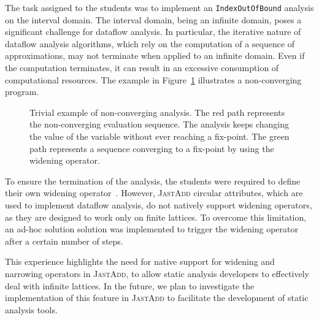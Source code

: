 The task assigned to the students was to implement an \texttt{IndexOutOfBound} analysis on the interval domain.
The interval domain, being an infinite domain, poses a significant challenge for
dataflow analysis. In particular,
the iterative nature of dataflow analysis algorithms, which rely on the computation
of a sequence of approximations, may not terminate when applied to an infinite domain.
Even if the computation terminates, it can result in an excessive consumption of computational resources. 
The example in Figure~\ref{fig:nonConverging}
illustrates a non-converging program.
\begin{figure}
	\centering
	\caption{\label{fig:nonConverging} Trivial example of non-converging analysis.
  The {\color{red}red} path represents the non-converging evaluation sequence.
  The analysis keeps changing the value of the variable  without ever
  reaching a fix-point. The {\color{ForestGreen}green} path represents a
  sequence converging to a fix-point by using the widening operator.
  }
\end{figure}

To ensure the termination of the analysis, the students were required to
define their own widening operator~\cite{Bagnara2003Widening}.
However, \textsc{JastAdd} circular attributes, which are used to implement dataflow
analysis, do not natively support widening operators, as they are designed
to work only on finite lattices. To overcome this limitation, an ad-hoc solution
solution was implemented to trigger the widening operator after a certain
number of steps.

This experience highlights the need for native support for widening and narrowing
operators in \textsc{JastAdd}, to allow static analysis developers to effectively deal with
infinite lattices. In the future, we plan to investigate the implementation of this
feature in \textsc{JastAdd} to facilitate the development of static analysis tools.


